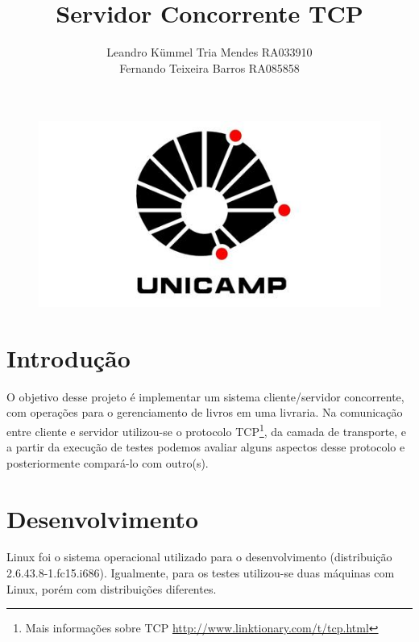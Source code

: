 \documentclass[a4paper,10pt]{article}
\title{Servidor Concorrente TCP}
\author{Leandro Kümmel Tria Mendes RA033910 \\ Fernando Teixeira Barros RA085858}
\begin{document}
\maketitle
\begin{figure}[!htb]
  \centering
  \includegraphics[scale=0.5]{logo.jpg}
\end{figure}
\newpage
\tableofcontents
\listoffigures
\listoftables
\newpage
\section{Introdução}
O objetivo desse projeto é implementar um sistema cliente/servidor
concorrente, com operações para o gerenciamento de livros em uma livraria.
Na comunicação entre cliente e servidor utilizou-se o protocolo TCP\footnote{
Mais informações sobre TCP \url{http://www.linktionary.com/t/tcp.html} }, da camada de transporte, e a partir da execução de testes podemos avaliar alguns aspectos
desse protocolo e posteriormente compará-lo com outro(s).
\section{Desenvolvimento}
Linux foi o sistema operacional utilizado para o desenvolvimento (distribuição
2.6.43.8-1.fc15.i686). Igualmente, para os testes utilizou-se duas máquinas com Linux, porém com distribuições diferentes.
\end{document}
